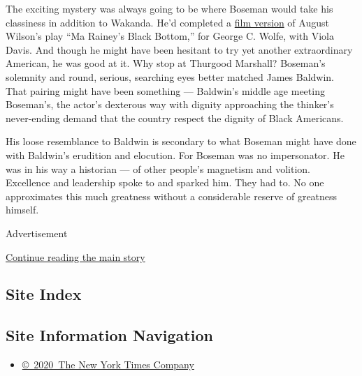 The exciting mystery was always going to be where Boseman would take his
classiness in addition to Wakanda. He'd completed a
\href{https://deadline.com/2020/08/netflix-delays-ma-raineys-black-bottom-virtual-preview-event-following-chadwick-boseman-death-1203026802/}{film
version} of August Wilson's play ``Ma Rainey's Black Bottom,'' for
George C. Wolfe, with Viola Davis. And though he might have been
hesitant to try yet another extraordinary American, he was good at it.
Why stop at Thurgood Marshall? Boseman's solemnity and round, serious,
searching eyes better matched James Baldwin. That pairing might have
been something --- Baldwin's middle age meeting Boseman's, the actor's
dexterous way with dignity approaching the thinker's never-ending demand
that the country respect the dignity of Black Americans.

His loose resemblance to Baldwin is secondary to what Boseman might have
done with Baldwin's erudition and elocution. For Boseman was no
impersonator. He was in his way a historian --- of other people's
magnetism and volition. Excellence and leadership spoke to and sparked
him. They had to. No one approximates this much greatness without a
considerable reserve of greatness himself.

Advertisement

\protect\hyperlink{after-bottom}{Continue reading the main story}

\hypertarget{site-index}{%
\subsection{Site Index}\label{site-index}}

\hypertarget{site-information-navigation}{%
\subsection{Site Information
Navigation}\label{site-information-navigation}}

\begin{itemize}
\tightlist
\item
  \href{https://help.nytimes3xbfgragh.onion/hc/en-us/articles/115014792127-Copyright-notice}{©~2020~The
  New York Times Company}
\end{itemize}

